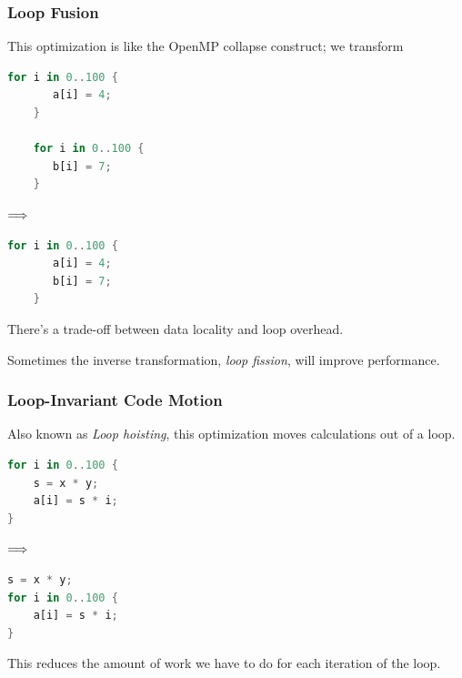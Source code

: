 \begin{frame}[fragile]
\frametitle{Loop Fusion}

This optimization is like the OpenMP collapse
construct; we transform
\begin{center}
\vspace*{-1em}
\begin{minipage}{.3\textwidth}
  \begin{lstlisting}[language=Rust]
    for i in 0..100 {
       a[i] = 4;
    }

    for i in 0..100 {
       b[i] = 7;
    }
  \end{lstlisting}
  \end{minipage} $\Longrightarrow \hspace*{2em}$ \begin{minipage}{.4\textwidth}
  \begin{lstlisting}[language=Rust]
    for i in 0..100 {
       a[i] = 4;
       b[i] = 7;
    }
  \end{lstlisting}
  \end{minipage}
  \end{center}
There's a trade-off between data locality and loop overhead.

Sometimes the inverse transformation, \emph{loop fission}, will
improve performance.

\end{frame}

\begin{frame}[fragile]
\frametitle{Loop-Invariant Code Motion}

 Also known as \emph{Loop hoisting},
this optimization moves calculations out of a loop. 
\begin{center}
\vspace*{-1em}
\begin{minipage}{.3\textwidth}
  \begin{lstlisting}[language=Rust]
for i in 0..100 {
    s = x * y;
    a[i] = s * i;
}
  \end{lstlisting}
  \end{minipage} $\Longrightarrow \hspace*{2em}$ \begin{minipage}{.4\textwidth}
  \begin{lstlisting}[language=Rust]
s = x * y;
for i in 0..100 {
    a[i] = s * i;
}
  \end{lstlisting}
  \end{minipage}
  \end{center}


This reduces the amount of work we have to do for each iteration of the loop.

\end{frame}


